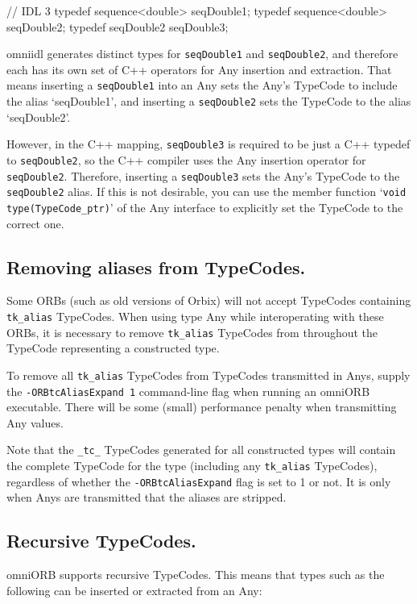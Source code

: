 \documentclass[11pt,oneside,a4paper]{book}
\newcommand{\type}[1]{\texttt{#1}}
\newcommand{\code}[1]{\texttt{#1}}
\begin{document}
\begin{idllisting}
// IDL 3
typedef sequence<double> seqDouble1;
typedef sequence<double> seqDouble2;
typedef seqDouble2       seqDouble3;
\end{idllisting}

omniidl generates distinct types for \type{seqDouble1} and
\type{seqDouble2}, and therefore each has its own set of C++ operators
for Any insertion and extraction. That means inserting a
\type{seqDouble1} into an Any sets the Any's TypeCode to include the
alias `seqDouble1', and inserting a \type{seqDouble2} sets the
TypeCode to the alias `seqDouble2'.

However, in the C++ mapping, \type{seqDouble3} is required to be just
a C++ typedef to \type{seqDouble2}, so the C++ compiler uses the Any
insertion operator for \type{seqDouble2}. Therefore, inserting a
\type{seqDouble3} sets the Any's TypeCode to the \type{seqDouble2}
alias. If this is not desirable, you can use the member function
`\code{void type(TypeCode\_ptr)}' of the Any interface to explicitly
set the TypeCode to the correct one.


\subsection{Removing aliases from TypeCodes.}
Some ORBs (such as old versions of Orbix) will not accept TypeCodes
containing \code{tk\_alias} TypeCodes. When using type Any while
interoperating with these ORBs, it is necessary to remove
\code{tk\_alias} TypeCodes from throughout the TypeCode representing a
constructed type.

To remove all \code{tk\_alias} TypeCodes from TypeCodes transmitted in
Anys, supply the \texttt{-ORBtcAliasExpand 1} command-line flag when
running an omniORB executable. There will be some (small) performance
penalty when transmitting Any values.

Note that the \code{\_tc\_} TypeCodes generated for all constructed
types will contain the complete TypeCode for the type (including any
\code{tk\_alias} TypeCodes), regardless of whether the
\texttt{-ORBtcAliasExpand} flag is set to 1 or not. It is only when
Anys are transmitted that the aliases are stripped.

\subsection{Recursive TypeCodes.}
omniORB supports recursive TypeCodes. This means that types such as
the following can be inserted or extracted from an Any:
\end{document}
